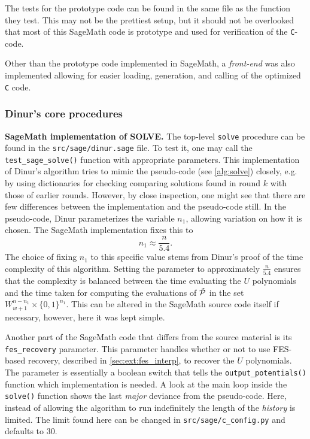 The tests for the prototype code can be found in the same file as the function they test. This may not be the prettiest setup, but it should not be overlooked that most of this SageMath code is prototype and used for verification of the \texttt{C}-code.

Other than the prototype code implemented in SageMath, a \textit{front-end} was also implemented allowing for easier loading, generation, and calling of the optimized \texttt{C} code. 

\subsubsection{Dinur's core procedures}
\textbf{SageMath implementation of SOLVE.}
The top-level \texttt{solve} procedure can be found in the \texttt{src/sage/dinur.sage} file. To test it, one may call the \texttt{test\_sage\_solve()} function with appropriate parameters. This implementation of Dinur's algorithm tries to mimic the pseudo-code (see \cref{alg:solve}) closely, e.g. by using dictionaries for checking comparing solutions found in round $k$ with those of earlier rounds. However, by close inspection, one might see that there are few differences between the implementation and the pseudo-code still. In the pseudo-code, Dinur parameterizes the variable $n_1$, allowing variation on how it is chosen. The SageMath implementation fixes this to 
$$
    n_1 \approx \frac{n}{5.4}.
$$
The choice of fixing $n_1$ to this specific value stems from Dinur's proof of the time complexity of this algorithm. Setting the parameter to approximately $\frac{n}{5.4}$ ensures that the complexity is balanced between the time evaluating the $U$ polynomials and the time taken for computing the evaluations of $\Tilde{\mathcal{P}}$ in the set $W^{n - n_1}_{w + 1} \times \{0,1\}^{n_1}$. This can be altered in the SageMath source code itself if necessary, however, here it was kept simple.

Another part of the SageMath code that differs from the source material is its 
\texttt{fes\_recovery} parameter. This parameter handles whether or not to use FES-based recovery, described in \cref{sec:ext:fes_interp}, to recover the $U$ polynomials. The parameter is essentially a boolean switch that tells the \texttt{output\_potentials()} function which implementation is needed. A look at the main loop inside the \texttt{solve()} function shows the last \textit{major} deviance from the pseudo-code. Here, instead of allowing the algorithm to run indefinitely the length of the \textit{history} is limited. The limit found here can be changed in \texttt{src/sage/c\_config.py} and defaults to 30.

